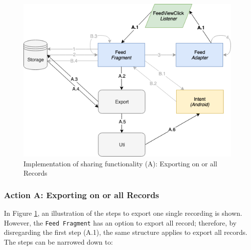 \begin{figure}
    \centering
    \includegraphics[scale=0.6]{images/Sharing_ImpA.png}
    \caption{Implementation of sharing functionality (A): Exporting on or all Records}
    \label{fig:impl_sharingA}
\end{figure}

\subsubsection{Action A: Exporting on or all Records}
In Figure \ref{fig:impl_sharingA}, an illustration of the steps to export one single recording is shown. However, the \verb|Feed Fragment| has an option to export all record; therefore, by disregarding the first step (A.1), the same structure applies to export all records. The steps can be narrowed down to: 

